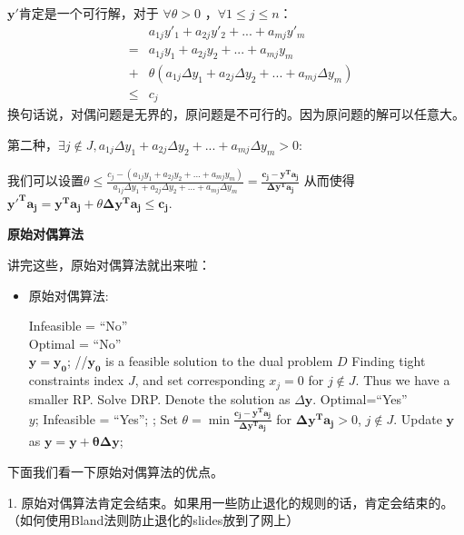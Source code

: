 $\mathbf{y'}$肯定是一个可行解，对于 $\forall \theta > 0$ ，$\forall 1 \leq j \leq n$：
 \begin{eqnarray}
&&  a_{1j}y'_1 + a_{2j}y'_2 + ... + a_{mj}y'_m \\
&=&a_{1j}y_1 + a_{2j}y_2 + ... + a_{mj}y_m \\
&+&\theta(a_{1j}\Delta{y_1} + a_{2j}\Delta{y_2} + ... + a_{mj}\Delta{y_m}) \\
&\leq& c_j
\end{eqnarray}
换句话说，对偶问题是无界的，原问题是不可行的。因为原问题的解可以任意大。

第二种，$\exists j \notin J, a_{1j} \Delta y_1 + a_{2j}\Delta y_2 + ... + a_{mj}\Delta y_m  >  0$:

我们可以设置$\theta \leq \frac{c_j - (a_{1j}y_1 + a_{2j}y_2 + ... + a_{mj}y_m) } {a_{1j}\Delta {y_1} + a_{2j}\Delta {y_2} + ... + a_{mj}\Delta {y_m}} = \frac{ \mathbf{c_j - y^Ta_j} }{ \mathbf{\Delta y^T a_j}  }$ 从而使得$\mathbf{y'^Ta_j} =\mathbf{y^Ta_j} + \theta \mathbf{\Delta y^Ta_j} \leq \mathbf{c_j}$.


\textbf{原始对偶算法}

讲完这些，原始对偶算法就出来啦：
\begin{itemize}
\item 原始对偶算法:
\begin{small}
\begin{algorithmic} [1]
\STATE Infeasible = ``No''\\
       Optimal = ``No''\\
        $\mathbf{y=y_{0}}$; \qquad //$\mathbf{y_{0}}$ is a feasible solution to the dual problem $D$
\STATE Finding tight constraints index $J$, and set corresponding $x_j = 0 $ for $ j\notin J$.
\STATE Thus we have a smaller RP.
\STATE Solve DRP. Denote the solution as $\Delta \mathbf{y}$.
\STATE Optimal=``Yes''\\
\RETURN $y$;
\ENDIF
{}
\STATE Infeasible = ``Yes'';
\RETURN;
\ENDIF
\STATE Set $\theta = \min{ \frac{ \mathbf{c_j - y^Ta_j} }{ \mathbf{\Delta y^T a_j}}}$ for $\mathbf{\Delta y^T a_j}>0$, $j\notin J$.
\STATE Update $\mathbf{ y}$ as  $ \mathbf{ y = y + \theta \Delta y}$;
\ENDWHILE
\end{algorithmic}
\end{small}
\end{itemize}
下面我们看一下原始对偶算法的优点。

1. 原始对偶算法肯定会结束。如果用一些防止退化的规则的话，肯定会结束的。（如何使用Bland法则防止退化的slides放到了网上）

